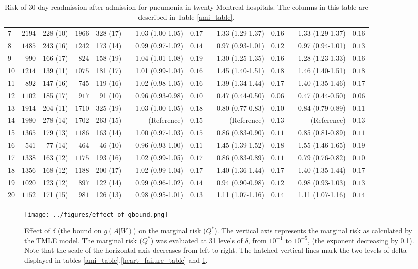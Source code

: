 \documentclass[]{article}\usepackage[]{graphicx}\usepackage[]{color}
\begin{document}
\begin{landscape}
\begin{table}[!tbp]
\begin{center}
\begin{tabular}{lrrrrcrrcrrcrr}
7&$2194$&228 (10)&$1966$&328 (17)&&1.03 (1.00-1.05)&$0.17$&&1.33 (1.29-1.37)&$0.16$&&1.33 (1.29-1.37)&$0.16$\tabularnewline
8&$1485$&243 (16)&$1242$&173 (14)&&0.99 (0.97-1.02)&$0.14$&&0.97 (0.93-1.01)&$0.12$&&0.97 (0.94-1.01)&$0.13$\tabularnewline
9&$ 990$&166 (17)&$ 824$&158 (19)&&1.04 (1.01-1.08)&$0.19$&&1.30 (1.25-1.35)&$0.16$&&1.28 (1.23-1.33)&$0.16$\tabularnewline
10&$1214$&139 (11)&$1075$&181 (17)&&1.01 (0.99-1.04)&$0.16$&&1.45 (1.40-1.51)&$0.18$&&1.46 (1.40-1.51)&$0.18$\tabularnewline
11&$ 892$&147 (16)&$ 745$&119 (16)&&1.02 (0.98-1.05)&$0.16$&&1.39 (1.34-1.44)&$0.17$&&1.40 (1.35-1.46)&$0.17$\tabularnewline
12&$1102$&185 (17)&$ 917$&91 (10)&&0.96 (0.93-0.98)&$0.10$&&0.47 (0.44-0.50)&$0.06$&&0.47 (0.44-0.50)&$0.06$\tabularnewline
13&$1914$&204 (11)&$1710$&325 (19)&&1.03 (1.00-1.05)&$0.18$&&0.80 (0.77-0.83)&$0.10$&&0.84 (0.79-0.89)&$0.11$\tabularnewline
14&$1980$&278 (14)&$1702$&263 (15)&&(Reference)&$0.15$&&(Reference)&$0.13$&&(Reference)&$0.13$\tabularnewline
15&$1365$&179 (13)&$1186$&163 (14)&&1.00 (0.97-1.03)&$0.15$&&0.86 (0.83-0.90)&$0.11$&&0.85 (0.81-0.89)&$0.11$\tabularnewline
16&$ 541$&77 (14)&$ 464$&46 (10)&&0.96 (0.93-1.00)&$0.11$&&1.45 (1.39-1.52)&$0.18$&&1.55 (1.46-1.65)&$0.19$\tabularnewline
17&$1338$&163 (12)&$1175$&193 (16)&&1.02 (0.99-1.05)&$0.17$&&0.86 (0.83-0.89)&$0.11$&&0.79 (0.76-0.82)&$0.10$\tabularnewline
18&$1356$&168 (12)&$1188$&200 (17)&&1.02 (0.99-1.04)&$0.17$&&1.40 (1.36-1.44)&$0.17$&&1.40 (1.35-1.44)&$0.17$\tabularnewline
19&$1020$&123 (12)&$ 897$&122 (14)&&0.99 (0.96-1.02)&$0.14$&&0.94 (0.90-0.98)&$0.12$&&0.98 (0.93-1.03)&$0.13$\tabularnewline
20&$1152$&171 (15)&$ 981$&126 (13)&&0.98 (0.95-1.01)&$0.13$&&1.11 (1.07-1.16)&$0.14$&&1.11 (1.07-1.16)&$0.14$\tabularnewline
\hline
\end{tabular}

\caption{Risk of 30-day readmission after admission for  pneumonia  in twenty Montreal hospitals.  The columns in this table are described in Table \ref{ami_table}.\label{pneumonia_table}}\end{center}

\end{table}

\end{landscape}
\begin{figure}[]
    \centerline{
      \texttt{[image: ../figures/effect\_of\_gbound.png]}
    }
    \caption[Effect of $\delta$ (the bound on $g(A|W)$) on the marginal risk.]
      {Effect of $\delta$ (the bound on $g(A|W)$) on the marginal risk ($Q^*$). The vertical axis represents the marginal risk as calculated by the TMLE model. The marginal risk ($Q^*$) was evaluated at 31 levels of $\delta$, from $10^{-1}$ to $10^{-5}$, (the exponent decreasing by 0.1). Note that the scale of the horizontal axis decreases from left-to-right. The hatched vertical lines mark the two levels of delta displayed in tables \ref{ami_table},\ref{heart_failure_table} and \ref{pneumonia_table}.}
    \label{fig:effect_of_gbound}
\end{figure}
\end{document}
